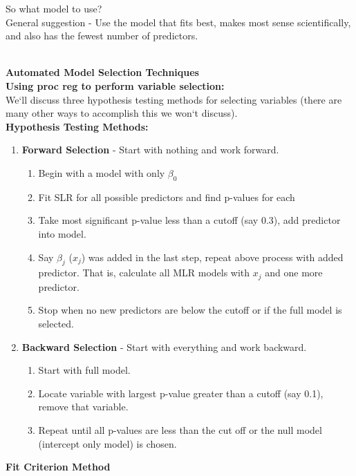 So what model to use? \\
General suggestion - Use the model that fits best, makes most sense scientifically, and also has the fewest number of predictors.\\~\\

\newpage

\Large\textbf{Automated Model Selection Techniques}\large\\

\textbf{Using proc reg to perform variable selection:}\\
We`ll discuss three hypothesis testing methods for selecting variables (there are many other ways to accomplish this we won`t discuss).\\

\textbf{Hypothesis Testing Methods:}
\begin{enumerate}
\item \textbf{Forward Selection} - Start with nothing and work forward.
	\begin{enumerate}
		\item Begin with a model with only $\beta_0$
		\item Fit SLR for all possible predictors and find p-values for each
		\item Take most significant p-value less than a cutoff (say 0.3), add predictor into model.  
		\item Say $\beta_j$ ($x_j$) was added in the last step, repeat above process with added predictor.  That is, calculate all MLR models with $x_j$ and one more predictor.
		\item Stop when no new predictors are below the cutoff or if the full model is selected.
	\end{enumerate}
\item \textbf{Backward Selection} - Start with everything and work backward. 
\begin{enumerate}
		\item Start with full model.
		\item Locate variable with largest p-value greater than a cutoff (say 0.1), remove that variable.
		\item Repeat until all p-values are less than the cut off or the null model (intercept only model) is chosen.
	\end{enumerate}
\end{enumerate}
\textbf{Fit Criterion Method}	
